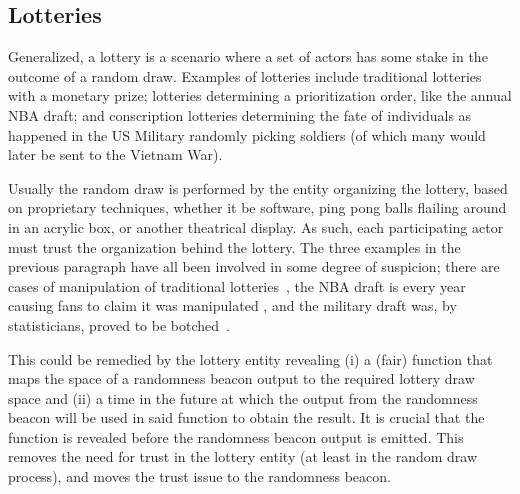 \subsection{Lotteries}\label{subsec:usecase_lotteries}
Generalized, a lottery is a scenario where a set of actors has some stake in the outcome of a random draw. Examples of lotteries include traditional lotteries with a monetary prize; lotteries determining a prioritization order, like the annual NBA draft; and conscription lotteries determining the fate of individuals as happened in the US Military randomly picking soldiers (of which many would later be sent to the Vietnam War).

Usually the random draw is performed by the entity organizing the lottery, based on proprietary techniques, whether it be software, ping pong balls flailing around in an acrylic box, or another theatrical display. As such, each participating actor must trust the organization behind the lottery. The three examples in the previous paragraph have all been involved in some degree of suspicion; there are cases of manipulation of traditional lotteries~\cite{lotteryscandal-eddietipton, lotteryscandal-666}, the NBA draft is every year causing fans to claim it was manipulated , and the military draft was, by statisticians, proved to be botched~\cite{starr1997nonrandom}. 

This could be remedied by the lottery entity revealing (i) a (fair) function that maps the space of a randomness beacon output to the required lottery draw space and (ii) a time in the future at which the output from the randomness beacon will be used in said function to obtain the result. It is crucial that the function is revealed before the randomness beacon output is emitted. This removes the need for trust in the lottery entity (at least in the random draw process), and moves the trust issue to the randomness beacon.
